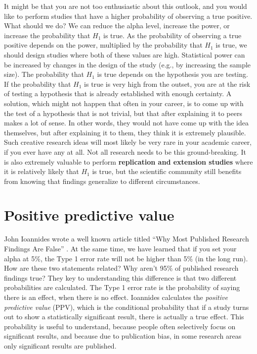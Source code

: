 \documentclass[
  oneside]{krantz}
\begin{document}
It might be that you are not too enthusiastic about this outlook, and you would like to perform studies that have a higher probability of observing a true positive. What should we do? We can reduce the alpha level, increase the power, or increase the probability that \(H_1\) is true. As the probability of observing a true positive depends on the power, multiplied by the probability that \(H_1\) is true, we should design studies where both of these values are high. Statistical power can be increased by changes in the design of the study (e.g., by increasing the sample size). The probability that \(H_1\) is true depends on the hypothesis you are testing. If the probability that \(H_1\) is true is very high from the outset, you are at the risk of testing a hypothesis that is already established with enough certainty. A solution, which might not happen that often in your career, is to come up with the test of a hypothesis that is not trivial, but that after explaining it to peers makes a lot of sense. In other words, they would not have come up with the idea themselves, but after explaining it to them, they think it is extremely plausible. Such creative research ideas will most likely be very rare in your academic career, if you ever have any at all. Not all research needs to be this ground-breaking. It is also extremely valuable to perform \textbf{replication and extension studies} where it is relatively likely that \(H_1\) is true, but the scientific community still benefits from knowing that findings generalize to different circumstances.

\hypertarget{ppv}{%
\section{Positive predictive value}\label{ppv}}

John Ioannides wrote a well known article titled ``Why Most Published Research Findings Are False'' \citep{ioannidis_why_2005}. At the same time, we have learned that if you set your alpha at 5\%, the Type 1 error rate will not be higher than 5\% (in the long run). How are these two statements related? Why aren't 95\% of published research findings true? They key to understanding this difference is that two different probabilities are calculated. The Type 1 error rate is the probability of saying there is an effect, when there is no effect. Ioannides calculates the \emph{positive predictive value} (PPV), which is the conditional probability that if a study turns out to show a statistically significant result, there is actually a true effect. This probability is useful to understand, because people often selectively focus on significant results, and because due to publication bias, in some research areas only significant results are published.
\end{document}
